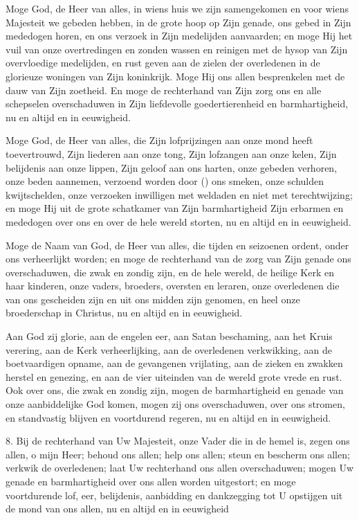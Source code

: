 \documentclass[12pt,twoside,a5paper]{article}
\begin{document}
\begin{halfparskip}
   Moge God, de Heer van alles, in wiens huis we zijn samengekomen en voor wiens Majesteit we gebeden hebben, in de grote hoop op Zijn genade, ons gebed in Zijn mededogen horen, en ons verzoek in Zijn medelijden aanvaarden; en moge Hij het vuil van onze overtredingen en zonden wassen en reinigen met de hysop van Zijn overvloedige medelijden, en rust geven aan de zielen der overledenen in de glorieuze woningen van Zijn koninkrijk. Moge Hij ons allen besprenkelen met de dauw van Zijn zoetheid. En moge de rechterhand van Zijn zorg ons en alle schepselen overschaduwen in Zijn liefdevolle goedertierenheid en barmhartigheid, nu en altijd en in eeuwigheid.

   Moge God, de Heer van alles, die Zijn lofprijzingen aan onze mond heeft toevertrouwd, Zijn liederen aan onze tong, Zijn lofzangen aan onze kelen, Zijn belijdenis aan onze lippen, Zijn geloof aan ons harten, onze gebeden verhoren, onze beden aannemen, verzoend worden door () ons smeken, onze schulden kwijtschelden, onze verzoeken inwilligen met weldaden en niet met terechtwijzing; en moge Hij uit de grote schatkamer van Zijn barmhartigheid Zijn erbarmen en mededogen over ons en over de hele wereld storten, nu en altijd en in eeuwigheid.

   Moge de Naam van God, de Heer van alles, die tijden en seizoenen ordent, onder ons verheerlijkt worden; en moge de rechterhand van de zorg van Zijn genade ons overschaduwen, die zwak en zondig zijn, en de hele wereld, de heilige Kerk en haar kinderen, onze vaders, broeders, oversten en leraren, onze overledenen die van ons gescheiden zijn en uit ons midden zijn genomen, en heel onze broederschap in Christus, nu en altijd en in eeuwigheid.

   Aan God zij glorie, aan de engelen eer, aan Satan beschaming, aan het Kruis verering, aan de Kerk verheerlijking, aan de overledenen verkwikking, aan de boetvaardigen opname, aan de gevangenen vrijlating, aan de zieken en zwakken herstel en genezing, en aan de vier uiteinden van de wereld grote vrede en rust. Ook over ons, die zwak en zondig zijn, mogen de barmhartigheid en genade van onze aanbiddelijke God komen, mogen zij ons overschaduwen, over ons stromen, en standvastig blijven en voortdurend regeren, nu en altijd en in eeuwigheid.

  8. Bij de rechterhand van Uw Majesteit, onze Vader die in de hemel is, zegen ons allen, o mijn Heer; behoud ons allen; help ons allen; steun en bescherm ons allen; verkwik de overledenen; laat Uw rechterhand ons allen overschaduwen; mogen Uw genade en barmhartigheid over ons allen worden uitgestort; en moge voortdurende lof, eer, belijdenis, aanbidding en dankzegging tot U opstijgen uit de mond van ons allen, nu en altijd en in eeuwigheid


\end{halfparskip}
\end{document}
